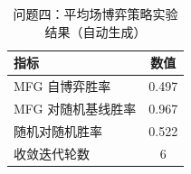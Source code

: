 \begin{table}[H]
\centering
\caption{问题四：平均场博弈策略实验结果（自动生成）}
\begin{tabular}{l c}
\toprule
指标 & 数值 \\
\midrule
MFG 自博弈胜率 & 0.497 \\
MFG 对随机基线胜率 & 0.967 \\
随机对随机胜率 & 0.522 \\
收敛迭代轮数 & 6 \\
\bottomrule
\end{tabular}
\end{table}

